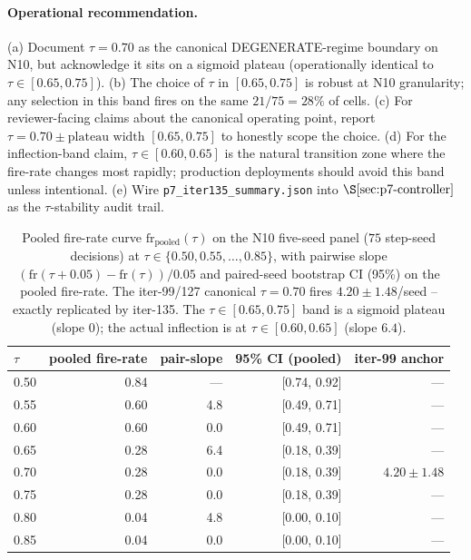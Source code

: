 \documentclass{article}
\begin{document}
\paragraph{Operational recommendation.}
(a) Document $\tau=0.70$ as the canonical DEGENERATE-regime boundary
on N10, but acknowledge it sits on a sigmoid plateau (operationally
identical to $\tau \in [0.65, 0.75]$). (b) The choice of $\tau$ in
$[0.65, 0.75]$ is robust at N10 granularity; any selection in this
band fires on the same $21/75 = 28\%$ of cells. (c) For reviewer-facing
claims about the canonical operating point, report
$\tau = 0.70 \pm \text{plateau width } [0.65, 0.75]$ to honestly scope
the choice. (d) For the inflection-band claim, $\tau \in [0.60, 0.65]$
is the natural transition zone where the fire-rate changes most
rapidly; production deployments should avoid this band unless
intentional. (e) Wire \texttt{p7\_iter135\_summary.json} into
$\S\ref{sec:p7-controller}$ as the $\tau$-stability audit trail.

\begin{table}[t]
\centering
\small
\begin{tabular}{lrrrr}
\hline
$\tau$ & pooled fire-rate & pair-slope & 95\% CI (pooled) & iter-99 anchor \\
\hline
0.50 & 0.84 & --- & [0.74, 0.92] & --- \\
0.55 & 0.60 & 4.8 & [0.49, 0.71] & --- \\
0.60 & 0.60 & 0.0 & [0.49, 0.71] & --- \\
0.65 & 0.28 & 6.4 & [0.18, 0.39] & --- \\
0.70 & 0.28 & 0.0 & [0.18, 0.39] & $4.20 \pm 1.48$ \\
0.75 & 0.28 & 0.0 & [0.18, 0.39] & --- \\
0.80 & 0.04 & 4.8 & [0.00, 0.10] & --- \\
0.85 & 0.04 & 0.0 & [0.00, 0.10] & --- \\
\hline
\end{tabular}
\caption{Pooled fire-rate curve $\mathrm{fr}_\mathrm{pooled}(\tau)$ on
the N10 five-seed panel ($75$ step-seed decisions) at $\tau \in
\{0.50, 0.55, \ldots, 0.85\}$, with pairwise slope
$(\mathrm{fr}(\tau{+}0.05) - \mathrm{fr}(\tau)) / 0.05$ and
paired-seed bootstrap CI (95\%) on the pooled fire-rate. The
iter-99/127 canonical $\tau=0.70$ fires $4.20 \pm 1.48$/seed -- exactly
replicated by iter-135. The $\tau \in [0.65, 0.75]$ band is a sigmoid
plateau (slope $0$); the actual inflection is at $\tau \in [0.60, 0.65]$
(slope $6.4$).}
\label{tab:p7-iter135-fire-rate}
\end{table} 
\end{document}
